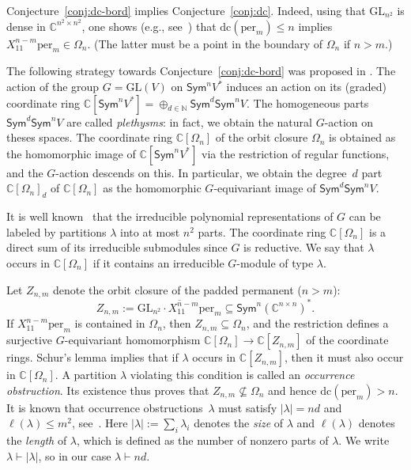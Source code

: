 \documentclass[11pt]{amsart}
\def\N{\mathbb{N}}
\def\C{\mathbb{C}}
\def\per{\mathrm{per}}
\def\GL{\mathrm{GL}}
\def\dc{\mathrm{dc}}
\def\Sym{\mathsf{Sym}}
\newcommand{\Det}{\Omega}
\newcommand{\ol}[1]{\overline{#1}}
\def\la{\lambda}
\def\ocp{Z}
\numberwithin{equation}{section}
\begin{document}

Conjecture~\ref{conj:dc-bord} implies Conjecture~\ref{conj:dc}. 
Indeed, using that 
$\GL_{n^2}$ is dense in $\C^{n^2\times n^2}$, 
one shows (e.g., see~\cite{buerg-survey:15})  
that $\dc(\per_m) \le n$ implies $X_{11}^{n-m} \per_m \in \Det_n$. 
(The latter must be a point in the boundary of $\Det_n$ if $n>m$.) 

The following strategy towards Conjecture~\ref{conj:dc-bord} was proposed in \cite{gct1}. 
The action of the group $G=\GL(V)$ on 
$\Sym^n V^*$ induces an action on its (graded) coordinate ring 
$\C[\Sym^n V^*]=\oplus_{d\in\N} \Sym^d \Sym^n V$. 
The homogeneous parts $\Sym^d \Sym^n V$ are called {\em plethysms}:  
in fact, we obtain the natural $G$-action on theses spaces. 
The coordinate ring $\C[\Det_n]$ of the orbit closure $\Det_n$ 
is obtained as the homomorphic image
of $\C[\Sym^n V^*]$ via the restriction of regular functions, 
and the $G$-action descends on this. 
In particular, we obtain the degree~$d$ part $\C[\Det_n]_d$ of $\C[\Det_n]$
as the homomorphic $G$-equivariant image of $\Sym^d \Sym^n V$. 

It is well known~\cite{FH:91} that 
the irreducible polynomial representations of $G$ can be labeled by 
partitions $\la$ into at most $n^2$ parts. 
The coordinate ring $\C[\Det_n]$ is a direct sum of its 
irreducible submodules since $G$ is reductive. 
We say that $\la$ occurs in $\C[\Det_n]$ if 
it contains %
an irreducible $G$-module of type $\la$. 

Let $\ocp_{n,m}$ denote the orbit closure of the padded permanent ($n>m$): 
\begin{equation}\label{def:Znm}
 \ocp_{n,m} := \ol{\GL_{n^2}\cdot X_{11}^{n-m} \per_m} \subseteq \Sym^n (\C^{n\times n})^*.
\end{equation}
If $X_{11}^{n-m} \per_m$ is contained in $\Det_n$, then 
$\ocp_{n,m} \subseteq \Det_n$, and the restriction defines 
a surjective $G$-equivariant homomorphism 
$\C[\Omega_n]\to\C[\ocp_{n,m}]$ of the coordinate rings. 
Schur's lemma implies that 
if $\la$ occurs in $\C[\ocp_{n,m}]$, 
then it must also occur in $\C[\Det_n]$. 
A partition $\la$ violating this condition is called an 
{\em occurrence obstruction}. Its existence thus 
proves that $\ocp_{n,m} \not\subseteq \Det_n$ 
and hence $\dc(\per_m)>n$.
It is known that occurrence obstructions~$\la$ 
must satisfy $|\la| = nd$ and $\ell(\la) \le m^2$, 
see~\cite{gct1,gct2,BLMW:11}.
Here $|\la| := \sum_i \la_i$ denotes the {\em size} of $\la$ 
and $\ell(\la)$ denotes the {\em length} of $\la$, 
which is defined as the number of 
nonzero parts of $\la$.
We write $\la \vdash |\la|$, so in our case $\la \vdash nd$.
\end{document}
